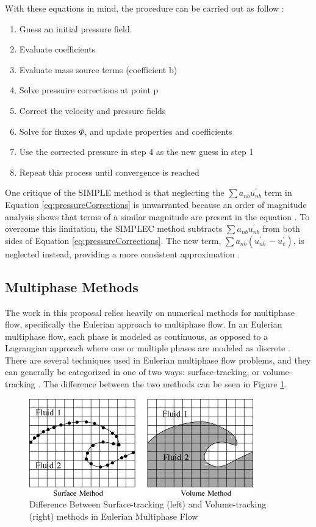 \documentclass{UCF_ETD}
\begin{document}
With these equations in mind, the procedure can be carried out as follow \cite{Patankar1972ACP}:

\begin{enumerate}
    \item Guess an initial pressure field.
    \item Evaluate coefficients
    \item Evaluate mass source terms (coefficient b)
    \item Solve pressuire corrections at point p
    \item Correct the velocity and pressure fields
    \item Solve for fluxes $\Phi$, and update properties and coefficients
    \item Use the corrected pressure in step 4 as the new guess in step 1
    \item Repeat this process until convergence is reached
\end{enumerate}

One critique of the SIMPLE method is that neglecting the $\sum{a_{nb}u_{nb}^\prime}$ term in Equation \ref{eq:pressureCorrections} is unwarranted because an order of magnitude analysis shows that terms of a similar magnitude are present in the equation \cite{SIMPLEC}. To overcome this limitation, the SIMPLEC method subtracts $\sum{a_{nb}u_{nb}^\prime}$ from both sides of Equation \ref{eq:pressureCorrections}. The new term, $\sum{a_{nb}\left(u_{nb\ }^\prime-u_e^\prime\right)}$, is neglected instead, providing a more consistent approximation \cite{SIMPLEC}. 

\subsection{Multiphase Methods}
\label{sec:multiphase}

The work in this proposal relies heavily on numerical methods for multiphase flow, specifically the Eulerian approach to multiphase flow. In an Eulerian multiphase flow, each phase is modeled as continuous, as opposed to a Lagrangian approach where one or multiple phases are modeled as discrete \cite{GOPALA2008204}. There are several techniques used in Eulerian multiphase flow problems, and they can generally be categorized in one of two ways: surface-tracking, or volume-tracking \cite{GOPALA2008204}. The difference between the two methods can be seen in Figure \ref{fig:SurfaceAndVolumeTracking}.

\begin{figure}
    \centering
    \includegraphics{Figures/surfaceAndVolumeTracking.jpg}
    \caption{Difference Between Surface-tracking (left) and Volume-tracking (right) methods in Eulerian Multiphase Flow \cite{GOPALA2008204}}
    \label{fig:SurfaceAndVolumeTracking}
\end{figure}
\end{document}
